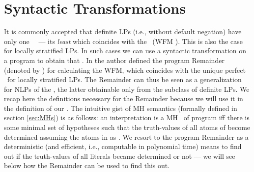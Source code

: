 \documentclass{llncs}
\begin{document}
	\section{Syntactic Transformations}
		It is commonly accepted that definite LPs (i.e., without default negation) have only one \twov\ \m\ --- its \emph{least \m} which coincides
		with the \WFM\ (WFM \cite{WFS}).
		This is also the case for locally stratified LPs.
		In such cases we can use a syntactic transformation on a program to obtain that \m.
		In \cite{DBLP:journals/tplp/BrassDFZ01} the author defined the program Remainder (denoted by ) for calculating the
		WFM, which coincides with the unique perfect \m\ for locally stratified LPs.
		The Remainder can thus be seen as a generalization for NLPs of the , the latter obtainable only from the subclass of definite LPs.
		We recap here the definitions necessary for the Remainder because we will use it in the definition of our \MHs.
		The intuitive gist of MH semantics (formally defined in section \ref{sec:MHs}) is as follows: an interpretation  is a MH \m\ of program  iff 
		there is some minimal set of hypotheses  such that the truth-values of all atoms of  become determined assuming the atoms in 
		as \true.
		We resort to the program Remainder as a deterministic (and efficient, i.e., computable in polynomial time) means to find out if
		the truth-values of all literals became determined or not --- we will see below how the Remainder can be used to find this out.
		
\end{document}
